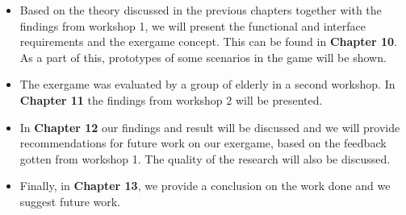 \begin{itemize}
\item Based on the theory discussed in the previous chapters together with the findings from workshop 1, we will present the functional and interface requirements and the exergame concept. This can be found in \textbf{Chapter 10}. As a part of this, prototypes of some scenarios in the game will be shown.
\item The exergame was evaluated by a group of elderly in a second workshop. In \textbf{Chapter 11} the findings from workshop 2 will be presented.
\item In \textbf{Chapter 12} our findings and result will be discussed and we will provide recommendations for future work on our exergame, based on the feedback gotten from workshop 1. The quality of the research will also be discussed.
\item Finally, in \textbf{Chapter 13}, we provide a conclusion on the work done and we suggest future work.

\end{itemize}
